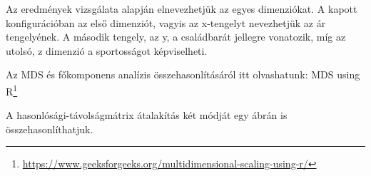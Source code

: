 \documentclass[
  letterpaper,
]{krantz}
\makeatletter
\newenvironment{Shaded}{\begin{snugshade}}{\end{snugshade}}
\newcommand{\CommentTok}[1]{\textcolor[rgb]{0.37,0.37,0.37}{#1}}
\newcommand{\FunctionTok}[1]{\textcolor[rgb]{0.28,0.35,0.67}{#1}}
\newcommand{\NormalTok}[1]{\textcolor[rgb]{0.00,0.23,0.31}{#1}}
\newcommand{\OtherTok}[1]{\textcolor[rgb]{0.00,0.23,0.31}{#1}}
\newcommand{\SpecialCharTok}[1]{\textcolor[rgb]{0.37,0.37,0.37}{#1}}
\renewcommand{\href}[2]{#2\footnote{\url{#1}}}
\newenvironment{kframe}{%
\medskip{}
\setlength{\fboxsep}{.8em}
 \def\at@end@of@kframe{}%
 \ifinner\ifhmode%
  \def\at@end@of@kframe{\end{minipage}}%
  \begin{minipage}{\columnwidth}%
 \fi\fi%
 \def\FrameCommand##1{\hskip\@totalleftmargin \hskip-\fboxsep
 \colorbox{shadecolor}{##1}\hskip-\fboxsep
     \hskip-\linewidth \hskip-\@totalleftmargin \hskip\columnwidth}%
 \MakeFramed {\advance\hsize-\width
   \@totalleftmargin\z@ \linewidth\hsize
   \@setminipage}}%
 {\par\unskip\endMakeFramed%
 \at@end@of@kframe}
\renewenvironment{Shaded}{\begin{kframe}}{\end{kframe}}
\makeatother
\begin{document}
\begin{Shaded}
\end{Shaded}

Az eredmények vizsgálata alapján elnevezhetjük az egyes dimenziókat. A
kapott konfigurációban az első dimenziót, vagyis az x-tengelyt
nevezhetjük az ár tengelyének. A második tengely, az y, a családbarát
jellegre vonatozik, míg az utolsó, z dimenzió a sportosságot
képviselheti.

Az MDS és főkomponens analízis összehasonlításáról itt olvashatunk:
\href{https://www.geeksforgeeks.org/multidimensional-scaling-using-r/}{MDS
using R}

A hasonlósági-távolságmátrix átalakítás két módját egy ábrán is
összehasonlíthatjuk.
\end{document}
